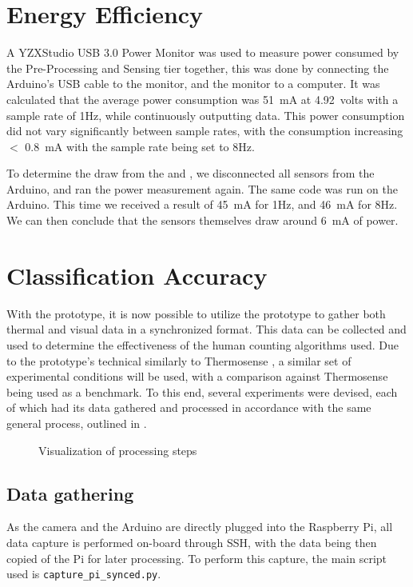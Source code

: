 \documentclass[../thesis/thesis.tex]{subfiles}
\begin{document}
\section{Energy Efficiency}

A YZXStudio USB 3.0 Power Monitor was used to measure power consumed by the Pre-Processing and Sensing tier together, this was done by connecting the Arduino's USB cable to the monitor, and the monitor to a computer. It was calculated that the average power consumption was 51~mA at 4.92~volts with a sample rate of 1Hz, while continuously outputting data. This power consumption did not vary significantly between sample rates, with the consumption increasing $<$ 0.8~mA with the sample rate being set to 8Hz.

To determine the draw from the \pir and \iar, we disconnected all sensors from the Arduino, and ran the power measurement again. The same code was run on the Arduino. This time we received a result of 45~mA for 1Hz, and 46~mA for 8Hz. We can then conclude that the sensors themselves draw around 6~mA of power.

\section{Classification Accuracy}

With the prototype, it is now possible to utilize the prototype to gather both thermal and visual data in a synchronized format. This data can be collected and used to determine the effectiveness of the human counting algorithms used. Due to the prototype's technical similarly to Thermosense \cite{beltran2013thermosense}, a similar set of experimental conditions will be used, with a comparison against Thermosense being used as a benchmark. To this end, several experiments were devised, each of which had its data gathered and processed in accordance with the same general process, outlined in .

\begin{figure}
\centering

\caption{Visualization of processing steps}
\label{fig:methods:flowchart}
\end{figure}

\subsection{Data gathering}
As the camera and the Arduino are directly plugged into the Raspberry Pi, all data capture is performed on-board through SSH, with the data being then copied of the Pi for later processing. To perform this capture, the main script used is \texttt{capture\_pi\_synced.py}.
\end{document}
